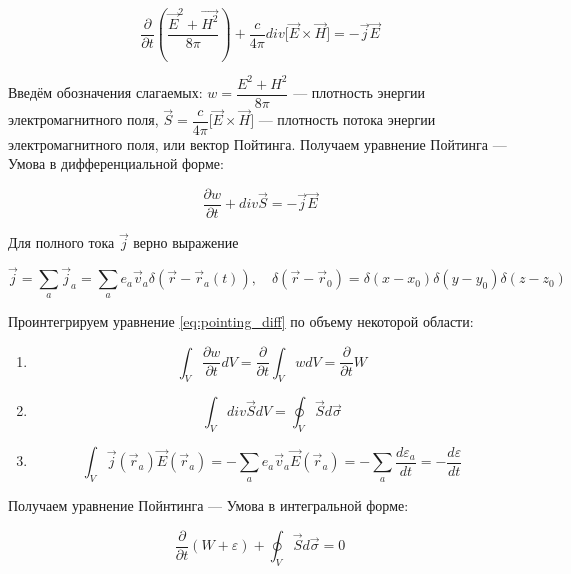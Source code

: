 \documentclass{article}
\begin{document}
\begin{equation}
    \frac{\partial}{\partial t}\left(\frac{\vec{E}^2+\vec{H^2}}{8\pi}\right)+\frac{c}{4\pi}div\lbrack\vec{E}\times\vec{H}\rbrack=-\vec{j}\vec{E}
\end{equation}

Введём обозначения слагаемых:  $w=\dfrac{E^2+H^2}{8\pi}$ --- плотность энергии электромагнитного поля, $\vec{S}=\dfrac{c}{4\pi}\lbrack\vec{E}\times\vec{H}\rbrack$ --- плотность потока энергии электромагнитного поля, или вектор Пойтинга. Получаем уравнение Пойтинга --- Умова в дифференциальной форме:

\begin{equation}\label{eq:pointing_diff}
    \frac{\partial w}{\partial t}+div\vec{S}=-\vec{j}\vec{E}
\end{equation}

Для полного тока $\vec{j}$ верно выражение 

\begin{equation*}
    \vec{j}=\sum_a\vec{j}_a=\sum_a e_a\vec{v}_a\delta\left(\vec{r}-\vec{r}_a\left(t\right)\right),\quad\delta\left(\vec{r}-\vec{r}_0\right)=\delta\left(x-x_0\right)\delta\left(y-y_0\right)\delta\left(z-z_0\right)
\end{equation*}

Проинтегрируем уравнение \eqref{eq:pointing_diff} по объему некоторой области:

\begin{enumerate}
    \item 
    \begin{equation*}
        \int_V\frac{\partial w}{\partial t}dV=\frac{\partial}{\partial t}\int_V wdV=\frac{\partial}{\partial t}W
    \end{equation*}
    \item
    \begin{equation*}
        \int_V div\vec{S}dV=\oint_V \vec{S}d\vec{\sigma}
    \end{equation*}
    \item
    \begin{equation*}
        \int_V \vec{j}(\vec{r}_a)\vec{E}(\vec{r}_a)=-\sum_a e_a \vec{v}_a \vec{E}(\vec{r}_a)=-\sum_a\frac{d\varepsilon_a}{dt}=-\frac{d\varepsilon}{dt}
    \end{equation*}
\end{enumerate}

Получаем уравнение Пойнтинга --- Умова в интегральной форме:

\begin{equation}\label{eq:pointing_int}
    \frac{\partial}{\partial t}\left(W+\varepsilon\right)+\oint_V \vec{S}d\vec{\sigma}=0
\end{equation}
\end{document}
